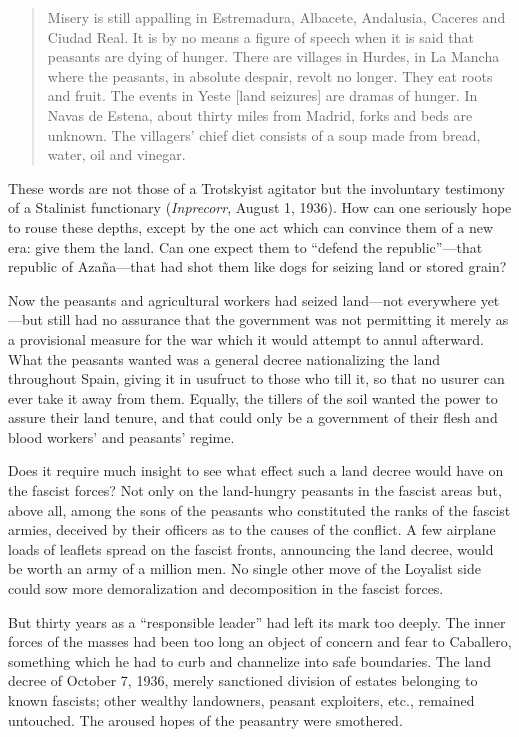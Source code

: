 \begin{quotation}
  Misery is still appalling in Estremadura, Albacete, Andalusia, Caceres and Ciudad Real. It is by no means a figure of speech when it is said that peasants are dying of hunger. There are villages in Hurdes, in La Mancha where the peasants, in absolute despair, revolt no longer. They eat roots and fruit. The events in Yeste [land seizures] are dramas of hunger. In Navas de Estena, about thirty miles from Madrid, forks and beds are unknown. The villagers’ chief diet consists of a soup made from bread, water, oil and vinegar.
\end{quotation}

These words are not those of a Trotskyist agitator but the involuntary testimony of a Stalinist functionary (\emph{Inprecorr}, August 1, 1936). How can one seriously hope to rouse these depths, except by the one act which can convince them of a new era: give them the land. Can one expect them to ``defend the republic''---that republic of Azaña---that had shot them like dogs for seizing land or stored grain?

Now the peasants and agricultural workers had seized land---not everywhere yet---but still had no assurance that the government was not permitting it merely as a provisional measure for the war which it would attempt to annul afterward. What the peasants wanted was a general decree nationalizing the land throughout Spain, giving it in usufruct to those who till it, so that no usurer can ever take it away from them. Equally, the tillers of the soil wanted the power to assure their land tenure, and that could only be a government of their flesh and blood workers’ and peasants’ regime.

Does it require much insight to see what effect such a land decree would have on the fascist forces? Not only on the land-hungry peasants in the fascist areas but, above all, among the sons of the peasants who constituted the ranks of the fascist armies, deceived by their officers as to the causes of the conflict. A few airplane loads of leaflets spread on the fascist fronts, announcing the land decree, would be worth an army of a million men. No single other move of the Loyalist side could sow more demoralization and decomposition in the fascist forces.

But thirty years as a ``responsible leader'' had left its mark too deeply. The inner forces of the masses had been too long an object of concern and fear to Caballero, something which he had to curb and channelize into safe boundaries. The land decree of October 7, 1936, merely sanctioned division of estates belonging to known fascists; other wealthy landowners, peasant exploiters, etc., remained untouched. The aroused hopes of the peasantry were smothered.

